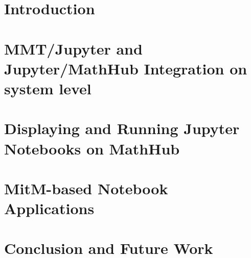 \documentclass{deliverablereport}
\author{Kai Amann, Michael Kohlhase, Florian Rabe, Tom Wiesing}
\begin{document}
\maketitle
\begin{abstract}\strut\\\end{abstract}
\setcounter{tocdepth}{2}
\tableofcontents
\clearpage

\section{Introduction}\label{sec:intro}


\section[System Level]{MMT/Jupyter and Jupyter/MathHub Integration on system level}\label{sec:mmt-jp}


\section[Notebooks on MathHub]{Displaying and Running Jupyter Notebooks on MathHub}\label{sec:nb-mh}


\section{MitM-based Notebook Applications}\label{sec:mitm-nb}


\section{Conclusion and Future Work}\label{sec:concl}


\printbibliography
\end{document}
